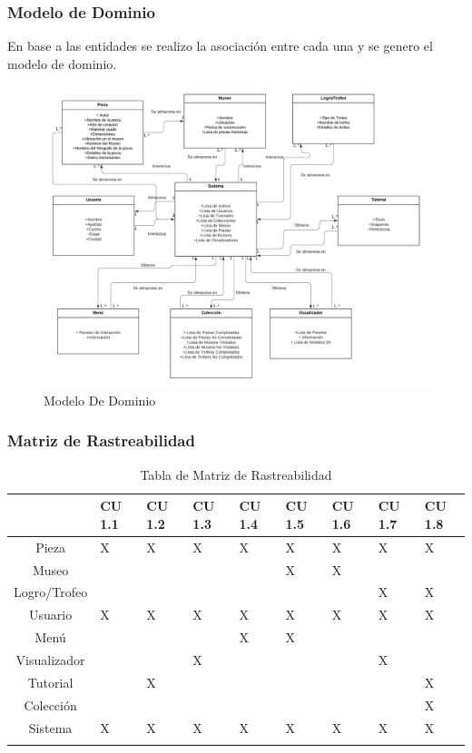 \subsubsection{Modelo de Dominio}
En base a las entidades se realizo la asociación entre cada una y se genero el modelo de dominio.

\begin{figure}[H]
\centerline{\includegraphics[width=15cm]{imgs/ModeloDeDominio.png}}
\caption{Modelo De Dominio}
\label{ModeloDom}
\end{figure}

\subsubsection{Matriz de Rastreabilidad}
\begin{longtable}{|c|p{1.3cm}|p{1.3cm}|p{1.3cm}|p{1.3cm}|p{1.3cm}|p{1.3cm}|p{1.3cm}|p{1.3cm}|}
\hline 
 & CU 1.1 & CU 1.2 & CU 1.3 & CU 1.4 & CU 1.5 & CU 1.6 & CU 1.7 & CU 1.8\\ 
\hline 
Pieza & X & X & X & X & X & X & X & X \\ 
\hline 
Museo &   &   &   &   & X & X &   &   \\ 
\hline
Logro/Trofeo &   &   &   &   &   &   & X & X \\ 
\hline
Usuario & X & X & X & X & X & X & X & X \\ 
\hline
Menú &   &   &   & X & X &   &   & \\ 
\hline
Visualizador &   &   & X &  &  	 &   & X & \\ 
\hline
Tutorial  &   & X &   &   &   &   &   & X \\ 
\hline
Colección &  &   &   &   &   &   &   & X \\ 
\hline
Sistema & X & X & X & X & X & X & X & X \\ 
\hline
\caption{Tabla de Matriz de Rastreabilidad}
\label{tab29}\\
\end{longtable}
